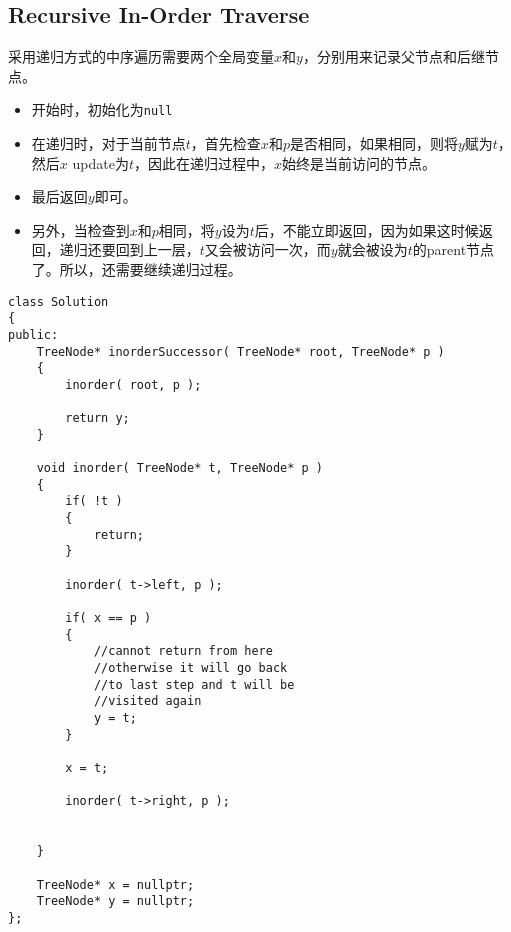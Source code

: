 \subsection{Recursive In-Order Traverse}
采用递归方式的中序遍历需要两个全局变量$x$和$y$，分别用来记录父节点和后继节点。
\begin{itemize}
    \item 开始时，初始化为\texttt{null}
    \item 在递归时，对于当前节点$t$，首先检查$x$和$p$是否相同，如果相同，则将$y$赋为$t$，然后$x$ update为$t$，因此在递归过程中，$x$始终是当前访问的节点。
    \item 最后返回$y$即可。
    \item 另外，当检查到$x$和$p$相同，将$y$设为$t$后，不能立即返回，因为如果这时候返回，递归还要回到上一层，$t$又会被访问一次，而$y$就会被设为$t$的parent节点了。所以，还需要继续递归过程。
\end{itemize}
\begin{lstlisting}[style=customc, caption={Recursive In-order Traverse}]
class Solution
{
public:
    TreeNode* inorderSuccessor( TreeNode* root, TreeNode* p )
    {
        inorder( root, p );

        return y;
    }

    void inorder( TreeNode* t, TreeNode* p )
    {
        if( !t )
        {
            return;
        }

        inorder( t->left, p );

        if( x == p )
        {
            //cannot return from here
            //otherwise it will go back
            //to last step and t will be
            //visited again
            y = t;
        }

        x = t;

        inorder( t->right, p );


    }

    TreeNode* x = nullptr;
    TreeNode* y = nullptr;
};
\end{lstlisting}
